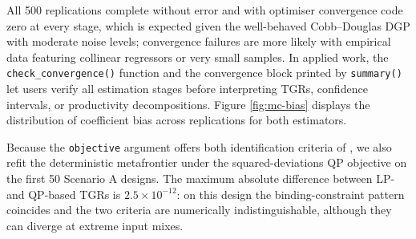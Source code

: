 \begin{table}
\centering
\caption{\label{tab:mc-results}Monte Carlo results for metafrontier coefficient estimation (500 successful replications out of 500). MC SE is the Monte Carlo standard error of the mean estimate; RMSE is the root mean squared error.}
\centering
{}
\end{table}

All 500 replications complete without error and with optimiser convergence
code zero at every stage, which is expected given the well-behaved
Cobb--Douglas DGP with moderate noise levels; convergence failures are more
likely with empirical data featuring collinear regressors or very small
samples. In applied work, the \texttt{check\_convergence()} function and the
convergence block printed by \texttt{summary()} let users verify all estimation
stages before interpreting TGRs, confidence intervals, or productivity
decompositions. Figure \ref{fig:mc-bias} displays the distribution of
coefficient bias across replications for both estimators.

Because the \texttt{objective} argument offers both identification criteria of
\citet{battese2004}, we also refit the deterministic metafrontier under the
squared-deviations QP objective on the first 50 Scenario A designs. The
maximum absolute difference between LP- and QP-based TGRs is
\ensuremath{2.5\times 10^{-12}}: on this design the binding-constraint
pattern coincides and the two criteria are numerically indistinguishable,
although they can diverge at extreme input mixes.

